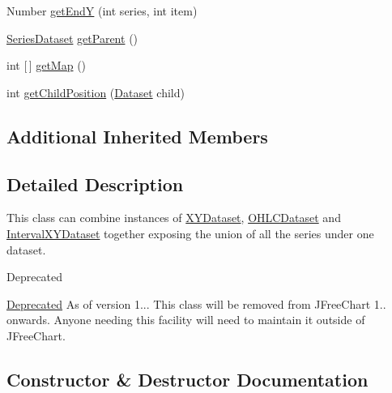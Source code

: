 \begin{DoxyCompactItemize}
Number \mbox{\hyperlink{classorg_1_1jfree_1_1data_1_1general_1_1_combined_dataset_a6a2884b2c6d9b9e538a984b9aa99efe1}{get\+EndY}} (int series, int item)
\item 
\mbox{\hyperlink{interfaceorg_1_1jfree_1_1data_1_1general_1_1_series_dataset}{Series\+Dataset}} \mbox{\hyperlink{classorg_1_1jfree_1_1data_1_1general_1_1_combined_dataset_a75becba98ba679e1e4fbf9b36c77ac13}{get\+Parent}} ()
\item 
int \mbox{[}$\,$\mbox{]} \mbox{\hyperlink{classorg_1_1jfree_1_1data_1_1general_1_1_combined_dataset_a4e31368adeb280dd35e158ee9505e89b}{get\+Map}} ()
\item 
int \mbox{\hyperlink{classorg_1_1jfree_1_1data_1_1general_1_1_combined_dataset_ae75dd2adbfae3aa7c8f4258630c9063d}{get\+Child\+Position}} (\mbox{\hyperlink{interfaceorg_1_1jfree_1_1data_1_1general_1_1_dataset}{Dataset}} child)
\end{DoxyCompactItemize}
\subsection*{Additional Inherited Members}


\subsection{Detailed Description}
This class can combine instances of \mbox{\hyperlink{}{X\+Y\+Dataset}}, \mbox{\hyperlink{}{O\+H\+L\+C\+Dataset}} and \mbox{\hyperlink{}{Interval\+X\+Y\+Dataset}} together exposing the union of all the series under one dataset.

\begin{DoxyRefDesc}{Deprecated}
\item[\mbox{\hyperlink{deprecated__deprecated000259}{Deprecated}}]As of version 1... This class will be removed from J\+Free\+Chart 1.. onwards. Anyone needing this facility will need to maintain it outside of J\+Free\+Chart. \end{DoxyRefDesc}


\subsection{Constructor \& Destructor Documentation}
\mbox{\label{classorg_1_1jfree_1_1data_1_1general_1_1_combined_dataset_a4f3f3cd4bbf412bb84bcb5e08e6e67f8}} 

